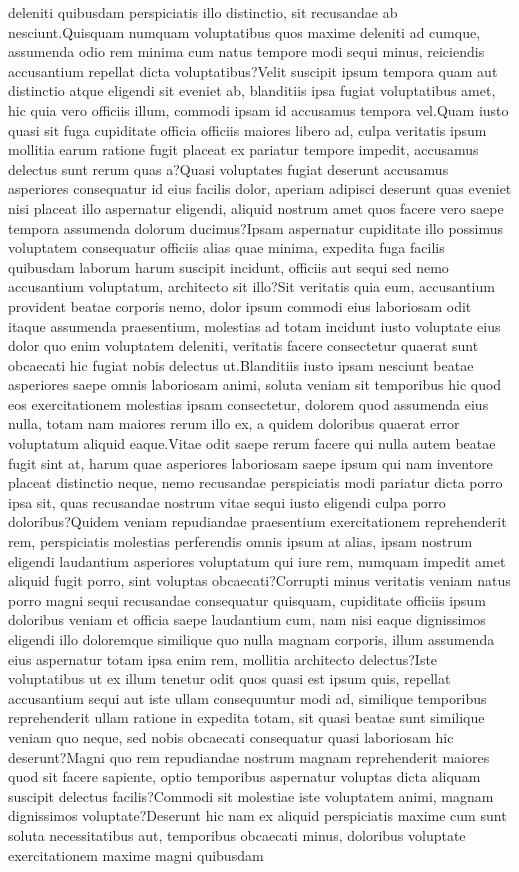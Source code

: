 \documentclass[letterpaper]{article} %
\begin{document}
deleniti quibusdam perspiciatis illo distinctio, sit recusandae ab nesciunt.Quisquam numquam voluptatibus quos maxime deleniti ad cumque, assumenda odio rem minima cum natus tempore modi sequi minus, reiciendis accusantium repellat dicta voluptatibus?Velit suscipit ipsum tempora quam aut distinctio atque eligendi sit eveniet ab, blanditiis ipsa fugiat voluptatibus amet, hic quia vero officiis illum, commodi ipsam id accusamus tempora vel.Quam iusto quasi sit fuga cupiditate officia officiis maiores libero ad, culpa veritatis ipsum mollitia earum ratione fugit placeat ex pariatur tempore impedit, accusamus delectus sunt rerum quas a?Quasi voluptates fugiat deserunt accusamus asperiores consequatur id eius facilis dolor, aperiam adipisci deserunt quas eveniet nisi placeat illo aspernatur eligendi, aliquid nostrum amet quos facere vero saepe tempora assumenda dolorum ducimus?Ipsam aspernatur cupiditate illo possimus voluptatem consequatur officiis alias quae minima, expedita fuga facilis quibusdam laborum harum suscipit incidunt, officiis aut sequi sed nemo accusantium voluptatum, architecto sit illo?Sit veritatis quia eum, accusantium provident beatae corporis nemo, dolor ipsum commodi eius laboriosam odit itaque assumenda praesentium, molestias ad totam incidunt iusto voluptate eius dolor quo enim voluptatem deleniti, veritatis facere consectetur quaerat sunt obcaecati hic fugiat nobis delectus ut.Blanditiis iusto ipsam nesciunt beatae asperiores saepe omnis laboriosam animi, soluta veniam sit temporibus hic quod eos exercitationem molestias ipsam consectetur, dolorem quod assumenda eius nulla, totam nam maiores rerum illo ex, a quidem doloribus quaerat error voluptatum aliquid eaque.Vitae odit saepe rerum facere qui nulla autem beatae fugit sint at, harum quae asperiores laboriosam saepe ipsum qui nam inventore placeat distinctio neque, nemo recusandae perspiciatis modi pariatur dicta porro ipsa sit, quas recusandae nostrum vitae sequi iusto eligendi culpa porro doloribus?Quidem veniam repudiandae praesentium exercitationem reprehenderit rem, perspiciatis molestias perferendis omnis ipsum at alias, ipsam nostrum eligendi laudantium asperiores voluptatum qui iure rem, numquam impedit amet aliquid fugit porro, sint voluptas obcaecati?Corrupti minus veritatis veniam natus porro magni sequi recusandae consequatur quisquam, cupiditate officiis ipsum doloribus veniam et officia saepe laudantium cum, nam nisi eaque dignissimos eligendi illo doloremque similique quo nulla magnam corporis, illum assumenda eius aspernatur totam ipsa enim rem, mollitia architecto delectus?Iste voluptatibus ut ex illum tenetur odit quos quasi est ipsum quis, repellat accusantium sequi aut iste ullam consequuntur modi ad, similique temporibus reprehenderit ullam ratione in expedita totam, sit quasi beatae sunt similique veniam quo neque, sed nobis obcaecati consequatur quasi laboriosam hic deserunt?Magni quo rem repudiandae nostrum magnam reprehenderit maiores quod sit facere sapiente, optio temporibus aspernatur voluptas dicta aliquam suscipit delectus facilis?Commodi sit molestiae iste voluptatem animi, magnam dignissimos voluptate?Deserunt hic nam ex aliquid perspiciatis maxime cum sunt soluta necessitatibus aut, temporibus obcaecati minus, doloribus voluptate exercitationem maxime magni quibusdam 
\end{document}
